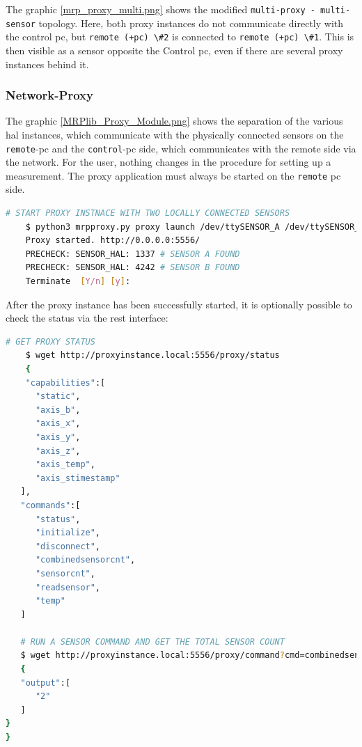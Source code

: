 The graphic \ref{mrp_proxy_multi.png} shows the modified
\passthrough{\lstinline!multi-proxy - multi-sensor!} topology. Here,
both proxy instances do not communicate directly with the control
\gls{pc}, but \passthrough{\lstinline!remote (+pc) \#2!} is connected to
\passthrough{\lstinline!remote (+pc) \#1!}. This is then visible as a
sensor opposite the Control \gls{pc}, even if there are several proxy
instances behind it.

\hypertarget{network-proxy}{%
\subsubsection{Network-Proxy}\label{network-proxy}}

The graphic \ref{MRPlib_Proxy_Module.png} shows the separation of the
various \gls{hal} instances, which communicate with the physically
connected sensors on the \passthrough{\lstinline!remote!}-\gls{pc} and
the \passthrough{\lstinline!control!}-\gls{pc} side, which communicates
with the remote side via the network. For the user, nothing changes in
the procedure for setting up a measurement. The proxy application must
always be started on the \passthrough{\lstinline!remote!} \gls{pc} side.

\begin{lstlisting}[language=bash]
    # START PROXY INSTNACE WITH TWO LOCALLY CONNECTED SENSORS
    $ python3 mrpproxy.py proxy launch /dev/ttySENSOR_A /dev/ttySENSOR_B # add another proxy instance http://proxyinstance_2.local for multi-sensor, multi-proxy chain
    Proxy started. http://0.0.0.0:5556/
    PRECHECK: SENSOR_HAL: 1337 # SENSOR A FOUND
    PRECHECK: SENSOR_HAL: 4242 # SENSOR B FOUND
    Terminate  [Y/n] [y]: 
\end{lstlisting}

After the proxy instance has been successfully started, it is optionally
possible to check the status via the \gls{rest} interface:

\begin{lstlisting}[language=bash]
    # GET PROXY STATUS
    $ wget http://proxyinstance.local:5556/proxy/status
    {
    "capabilities":[
      "static",
      "axis_b",
      "axis_x",
      "axis_y",
      "axis_z",
      "axis_temp",
      "axis_stimestamp"
   ],
   "commands":[
      "status",
      "initialize",
      "disconnect",
      "combinedsensorcnt",
      "sensorcnt",
      "readsensor",
      "temp"
   ]

   # RUN A SENSOR COMMAND AND GET THE TOTAL SENSOR COUNT
   $ wget http://proxyinstance.local:5556/proxy/command?cmd=combinedsensorcnt
   {
   "output":[
      "2"
   ]
}
}
\end{lstlisting}

